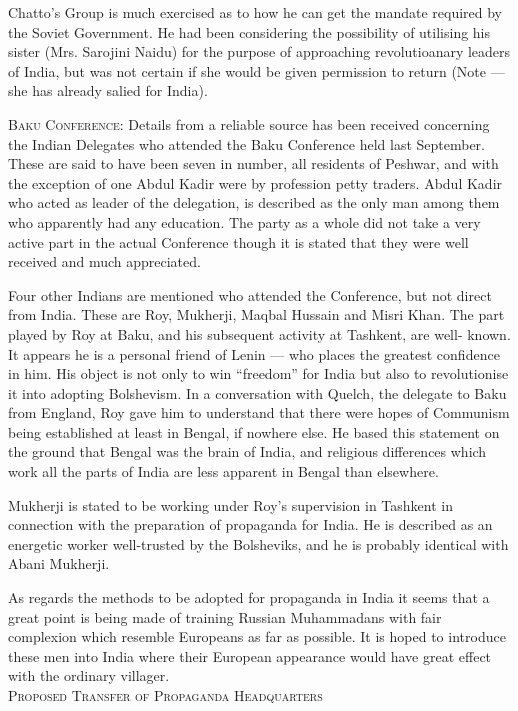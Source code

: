 Chatto’s Group is much exercised as to how he can get the mandate required by the Soviet Government. He had been considering the possibility of utilising his sister (Mrs. Sarojini Naidu) for the purpose of approaching revolutioanary leaders of India, but was not certain if she would be given permission to return (Note — she has already salied for India). 

\textsc{Baku Conference:} Details from a reliable source has been received concerning the Indian Delegates who attended the 
Baku Conference held last September. These are said to have been seven in number, all residents of Peshwar, and with the 
exception of one Abdul Kadir were by profession petty traders. Abdul Kadir who acted as leader of the delegation, 
is described as the only man among them who apparently had any education. The party as a whole did not take a very 
active part in the actual Conference though it is stated that they were well received and much appreciated. 

Four other Indians are mentioned who attended the Conference, but not direct from India. These are Roy, Mukherji, 
Maqbal Hussain and Misri Khan. The part played by Roy at Baku, and his subsequent activity at Tashkent, are well- known. It appears he is a personal friend of Lenin — who places the greatest confidence in him. His object is not only to win “freedom” for India but also to revolutionise it into adopting Bolshevism. In a conversation with Quelch, the delegate to Baku from England, Roy gave him to understand 
that there were hopes of Communism being established at least in Bengal, if nowhere else. He based this statement on the ground that Bengal was the brain of India, and religious differences which work all the parts of India are less apparent in Bengal than elsewhere. 

Mukherji is stated to be working under Roy’s supervision in Tashkent in connection with the preparation of propaganda for India. He is described as an energetic worker well-trusted by the Bolsheviks, and he is probably identical with Abani Mukherji. 

As regards the methods to be adopted for propaganda in India it seems that a great point is being made of training Russian Muhammadans with fair complexion which resemble Europeans as far as possible. It is hoped to introduce these men into India where their European appearance would have great effect with the ordinary villager. \\

\textsc{Proposed Transfer of Propaganda Headquarters}\\

